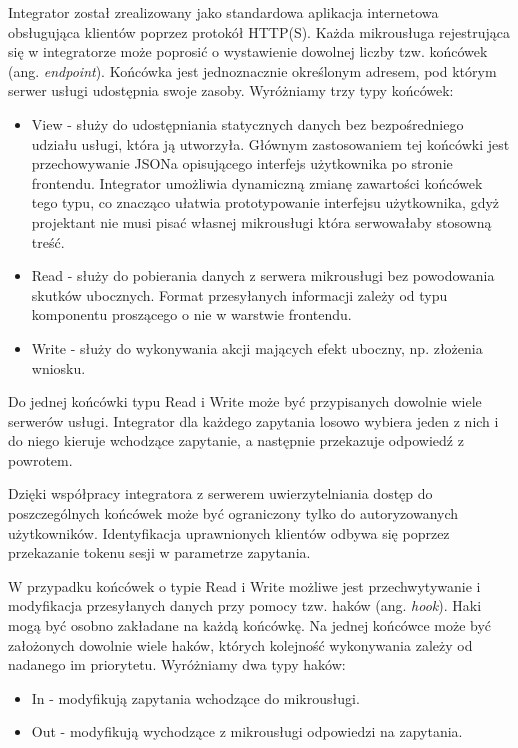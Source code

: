 \documentclass[licencjacka]{pracamgr}
\begin{document}
Integrator został zrealizowany jako standardowa aplikacja internetowa obsługująca
klientów poprzez protokół HTTP(S). Każda mikrousługa rejestrująca się w integratorze
może poprosić o wystawienie dowolnej liczby tzw. końcówek (ang. \textit{endpoint}).
Końcówka jest jednoznacznie określonym adresem, pod którym serwer usługi udostępnia
swoje zasoby. Wyróżniamy trzy typy końcówek:
\begin{itemize}
	\item View - służy do udostępniania statycznych danych bez bezpośredniego
	udziału usługi, która ją utworzyła. Głównym zastosowaniem tej końcówki jest
	przechowywanie JSONa opisującego interfejs użytkownika po stronie frontendu.
	Integrator umożliwia dynamiczną zmianę zawartości końcówek tego typu, co znacząco
	ułatwia prototypowanie interfejsu użytkownika, gdyż projektant nie musi pisać
	własnej mikrousługi która serwowałaby stosowną treść.
	\item Read - służy do pobierania danych z serwera mikrousługi bez powodowania
	skutków ubocznych. Format przesyłanych informacji zależy od typu komponentu
	proszącego o nie w warstwie frontendu.
	\item Write - służy do wykonywania akcji mających efekt uboczny, np. złożenia
	wniosku.
\end{itemize}
Do jednej końcówki typu Read i Write może być przypisanych dowolnie wiele serwerów
usługi. Integrator dla każdego zapytania losowo wybiera jeden z nich i do niego
kieruje wchodzące zapytanie, a następnie przekazuje odpowiedź z powrotem.

Dzięki współpracy integratora z serwerem uwierzytelniania dostęp do poszczególnych
końcówek może być ograniczony tylko do autoryzowanych użytkowników. Identyfikacja
uprawnionych klientów odbywa się poprzez przekazanie tokenu sesji w parametrze zapytania.

W przypadku końcówek o typie Read i Write możliwe jest przechwytywanie i modyfikacja
przesyłanych danych przy pomocy tzw. haków (ang. \textit{hook}). Haki mogą być
osobno zakładane na każdą końcówkę. Na jednej końcówce może być założonych dowolnie
wiele haków, których kolejność wykonywania zależy od nadanego im priorytetu.
Wyróżniamy dwa typy haków:
\begin{itemize}
	\item In - modyfikują zapytania wchodzące do mikrousługi.
	\item Out - modyfikują wychodzące z mikrousługi odpowiedzi na zapytania.
\end{itemize}
\end{document}
